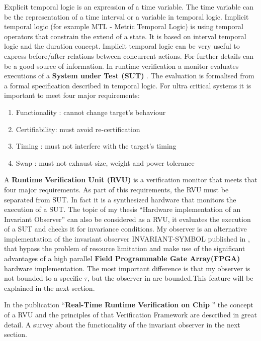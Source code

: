 Explicit temporal logic is an expression of a time variable. The time variable can be the representation of a time interval or a variable in temporal logic. 
Implicit temporal logic (for example MTL - Metric Temporal Logic) is using temporal operators that constrain the extend of a state.
It is based on interval temporal logic and the duration concept.
Implicit temporal logic can be very useful to express before/after relations between concurrent actions.
For further details \cite{210306} can be a good source of information.
In runtime verification a monitor evaluates executions of a \textbf{System under Test (SUT)} \cite{RTFMBJ13}. 
The evaluation is formalised from a formal specification described in temporal logic.\newpage
For ultra critical systems it is important to meet four major requirements:
\begin{enumerate}
 \item Functionality : cannot change target's behaviour
 \item Certifiability: must avoid re-certification
 \item Timing :	  must not interfere with the target's timing
 \item Swap :     must not exhaust size, weight and power tolerance
\end{enumerate}

A \textbf{Runtime Verification Unit (RVU)} is a verification monitor that meets that four major requirements.
As part of this requirements, the RVU must be separated from SUT.
In fact it is a synthesized hardware that monitors the execution of a SUT.\newline
The topic of my thesis ``Hardware implementation of an Invariant Observer'' can also be considered as a RVU, 
it evaluates the execution of a SUT and checks it for invariance conditions.
My observer is an alternative  implementation of the invariant observer INVARIANT-SYMBOL published in \cite{RTFMBJ13},
that bypass the problem of resource limitation and make use of the significant advantages of a high parallel
\textbf{Field Programmable Gate Array(FPGA)} hardware implementation.
The most important difference is that my observer is not bounded to a specific $\tau$, but the observer in \cite{RTFMBJ13}
are bounded.This feature will be explained in the next section.

In the publication ``\textbf{Real-Time Runtime Verification on Chip} '' \cite{RTFMBJ13} the concept of a RVU and 
the principles of that Verification Framework are described in great detail.\newline\newline
A survey about the functionality of the invariant observer in the next section.




